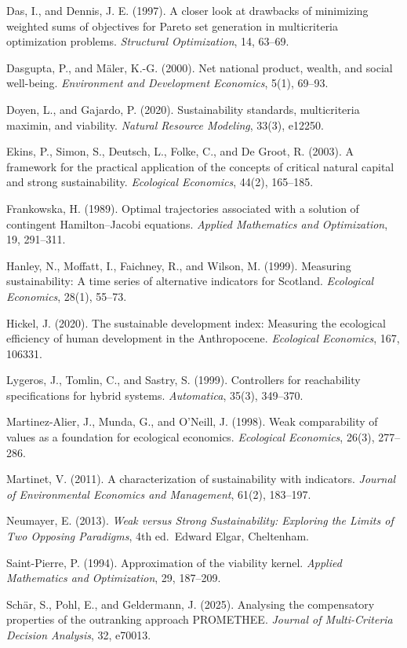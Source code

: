 \documentclass[11pt]{article}
\begin{document}
Das, I., and Dennis, J. E. (1997). A closer look at drawbacks of
minimizing weighted sums of objectives for Pareto set generation in
multicriteria optimization problems. \emph{Structural Optimization}, 14,
63--69.

Dasgupta, P., and M\"aler, K.-G. (2000). Net national product, wealth, and
social well-being. \emph{Environment and Development Economics}, 5(1),
69--93.

Doyen, L., and Gajardo, P. (2020). Sustainability standards,
multicriteria maximin, and viability. \emph{Natural Resource Modeling},
33(3), e12250.

Ekins, P., Simon, S., Deutsch, L., Folke, C., and De Groot, R. (2003). A
framework for the practical application of the concepts of critical
natural capital and strong sustainability. \emph{Ecological Economics},
44(2), 165--185.

Frankowska, H. (1989). Optimal trajectories associated with a solution
of contingent Hamilton--Jacobi equations. \emph{Applied Mathematics and
Optimization}, 19, 291--311.

Hanley, N., Moffatt, I., Faichney, R., and Wilson, M. (1999). Measuring
sustainability: A time series of alternative indicators for Scotland.
\emph{Ecological Economics}, 28(1), 55--73.

Hickel, J. (2020). The sustainable development index: Measuring the
ecological efficiency of human development in the Anthropocene.
\emph{Ecological Economics}, 167, 106331.

Lygeros, J., Tomlin, C., and Sastry, S. (1999). Controllers for
reachability specifications for hybrid systems. \emph{Automatica},
35(3), 349--370.

Martinez-Alier, J., Munda, G., and O'Neill, J. (1998). Weak
comparability of values as a foundation for ecological economics.
\emph{Ecological Economics}, 26(3), 277--286.

Martinet, V. (2011). A characterization of sustainability with
indicators. \emph{Journal of Environmental Economics and Management},
61(2), 183--197.

Neumayer, E. (2013). \emph{Weak versus Strong Sustainability: Exploring
the Limits of Two Opposing Paradigms}, 4th ed.~Edward Elgar, Cheltenham.

Saint-Pierre, P. (1994). Approximation of the viability kernel.
\emph{Applied Mathematics and Optimization}, 29, 187--209.

Sch\"ar, S., Pohl, E., and Geldermann, J. (2025). Analysing the
compensatory properties of the outranking approach PROMETHEE.
\emph{Journal of Multi-Criteria Decision Analysis}, 32, e70013.
\end{document}
